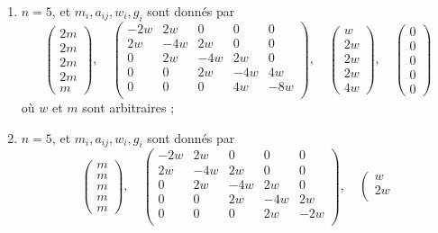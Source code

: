 \begin{lemma}[Genre un]
\begin{enumerate}
\item
\label{item-up-equal-equal-up}
$n = 5$, et $m_i, a_{ij}, w_i, g_i$ sont donnés par
$$
\left(
\begin{matrix}
2m \\
2m \\
2m \\
2m \\
m
\end{matrix}
\right),
\quad
\left(
\begin{matrix}
-2w & 2w & 0 & 0 & 0 \\
2w & -4w & 2w & 0 & 0 \\
0 & 2w & -4w & 2w & 0 \\
0 & 0 & 2w & -4w & 4w \\
0 & 0 & 0 & 4w & -8w \\
\end{matrix}
\right),
\quad
\left(
\begin{matrix}
w \\
2w \\
2w \\
2w \\
4w
\end{matrix}
\right),
\quad
\left(
\begin{matrix}
0 \\
0 \\
0 \\
0 \\
0
\end{matrix}
\right)
$$
où $w$ et $m$ sont arbitraires ;
\item
\label{item-up-equal-equal-down}
$n = 5$, et $m_i, a_{ij}, w_i, g_i$ sont donnés par
$$
\left(
\begin{matrix}
m \\
m \\
m \\
m \\
m
\end{matrix}
\right),
\quad
\left(
\begin{matrix}
-2w & 2w & 0 & 0 & 0 \\
2w & -4w & 2w & 0 & 0 \\
0 & 2w & -4w & 2w & 0 \\
0 & 0 & 2w & -4w & 2w \\
0 & 0 & 0 & 2w & -2w \\
\end{matrix}
\right),
\quad
\left(
\begin{matrix}
w \\
2w \\

\end{matrix}$$
\end{enumerate}
\end{lemma}
